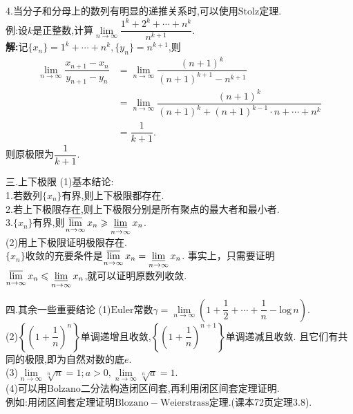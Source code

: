 \documentclass[UTF8]{ctexbeamer}
\begin{document}
    \begin{frame}
        4.当分子和分母上的数列有明显的递推关系时,可以使用$\mathrm{Stolz}$定理.
        \\例:设$k$是正整数,计算$\lim\limits_{n\to\infty}\dfrac{1^k+2^k+\cdots+n^k}{n^{k+1}}$.
        \pause
        \\\textbf{解:}记$\{x_n\}=1^k+\cdots +n^k,\{y_n\}=n^{k+1}$,则
        $$\begin{aligned}
            \lim\limits_{n\to\infty}\dfrac{x_{n+1}-x_n}{y_{n+1}-y_n}&=\lim\limits_{n\to\infty}\dfrac{(n+1)^k}{(n+1)^{k+1}-n^{k+1}}\\
            &=\lim\limits_{n\to\infty}\dfrac{(n+1)^k}{(n+1)^k+(n+1)^{k-1}\cdot n+\cdots+n^k}\\
            &=\dfrac{1}{k+1}.
        \end{aligned}$$
        则原极限为$\dfrac{1}{k+1}$.
    \end{frame}
    \begin{frame}{三.上下极限}
        (1)基本结论:
        \\\hspace*{20pt}1.若数列$\{x_n\}$有界,则上下极限都存在.
        \\\hspace*{20pt}2.若上下极限存在,则上下极限分别是所有聚点的最大者和最小者.
        \\\hspace*{20pt}3.$\{x_n\}$有界,则$\varlimsup\limits_{n\to\infty}x_n\geqslant \varliminf\limits_{n\to\infty}x_n$.
        \\(2)用上下极限证明极限存在.
        \\$\{x_n\}$收敛的充要条件是$\varlimsup\limits_{n\to\infty}x_n=\varliminf\limits_{n\to\infty}x_n$.
        事实上，只需要证明$\varlimsup\limits_{n\to\infty}x_n\leqslant \varliminf\limits_{n\to\infty}x_n$,就可以证明原数列收敛.
    \end{frame}
    \begin{frame}{四.其余一些重要结论}
        (1)$\mathrm{Euler}$常数$\gamma=\lim\limits_{n\to\infty}\left(1+\dfrac{1}{2}+\cdots+\dfrac{1}{n}-\mathrm{log}\,n\right)$.
        \\(2)$\left\{\left(1+\dfrac{1}{n}\right)^n\right\}$单调递增且收敛,$\left\{\left(1+\dfrac{1}{n}\right)^{n+1}\right\}$单调递减且收敛.
        且它们有共同的极限,即为自然对数的底$e$.
        \\(3)$\lim\limits_{n\to\infty}\sqrt[n]{n}=1;a>0,\lim\limits_{n\to\infty}\sqrt[n]{a}=1$.
        \\(4)可以用$\mathrm{Bolzano}$二分法构造闭区间套,再利用闭区间套定理证明.
        \\\hspace*{15pt}例如:用闭区间套定理证明$\mathrm{Blozano-Weierstrass}$定理.(课本72页定理3.8).
    \end{frame}
\end{document}

